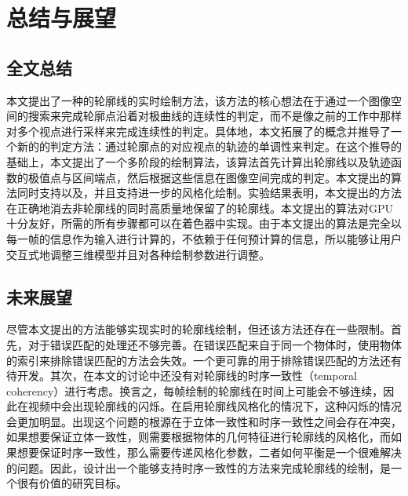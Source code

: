 \chapter{总结与展望}

\section{全文总结}

本文提出了一种\stc{}的轮廓线的实时绘制方法，该方法的核心想法在于通过一个图像空间的搜索来完成轮廓点沿着对极曲线的连续性的判定，而不是像之前的工作中那样对多个视点进行采样来完成连续性的判定。具体地，本文拓展了\epsl{}的概念并推导了一个新的\epsl{}的判定方法：通过轮廓点的对应视点的轨迹的单调性来判定\epsl{}。在这个推导的基础上，本文提出了一个多阶段的绘制算法，该算法首先计算出轮廓线以及轨迹函数的极值点与区间端点，然后根据这些信息在图像空间完成\epsl{}的判定。本文提出的算法同时支持\con{}以及\scon{}，并且支持进一步的风格化绘制。实验结果表明，本文提出的方法在正确地消去非\stc{}轮廓线的同时高质量地保留了\stc{}的轮廓线。本文提出的算法对GPU十分友好，所需的所有步骤都可以在着色器中实现。由于本文提出的算法是完全以每一帧的信息作为输入进行计算的，不依赖于任何预计算的信息，所以能够让用户交互式地调整三维模型并且对各种绘制参数进行调整。

\section{未来展望}

尽管本文提出的方法能够实现实时的\stc{}轮廓线绘制，但还该方法还存在一些限制。首先，对于错误匹配的处理还不够完善。在错误匹配来自于同一个物体时，使用物体的索引来排除错误匹配的方法会失效。一个更可靠的用于排除错误匹配的方法还有待开发。其次，在本文的讨论中还没有对轮廓线的时序一致性（temporal coherency）进行考虑。换言之，每帧绘制的轮廓线在时间上可能会不够连续，因此在视频中会出现轮廓线的闪烁。在启用轮廓线风格化的情况下，这种闪烁的情况会更加明显。出现这个问题的根源在于立体一致性和时序一致性之间会存在冲突，如果想要保证立体一致性，则需要根据物体的几何特征进行轮廓线的风格化，而如果想要保证时序一致性，那么需要传递风格化参数，二者如何平衡是一个很难解决的问题。因此，设计出一个能够支持时序一致性的方法来完成\stc{}轮廓线的绘制，是一个很有价值的研究目标。